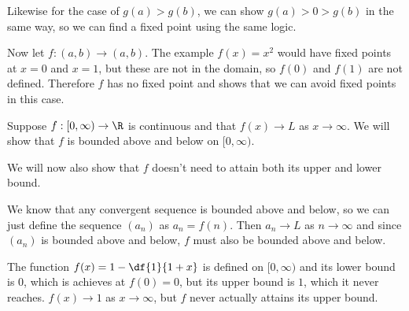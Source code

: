 \documentclass[a4paper]{article}
\begin{document}
Likewise for the case of $g(a) > g(b)$, we can show $g(a) > 0 > g(b)$ in the same way, so we can find a fixed point using the same logic.

Now let $f : (a, b) \to (a, b)$. The example $f(x) = x^2$ would have fixed points at $x=0$ and $x=1$, but these are not in the domain, so $f(0)$ and $f(1)$ are not defined. Therefore $f$ has no fixed point and shows that we can avoid fixed points in this case.


Suppose $f : [0, \infty) \to \R$ is continuous and that $f(x) \to L$ as $x \to \infty$. We will show that $f$ is bounded above and below on $[0, \infty)$.

We will now also show that $f$ doesn't need to attain both its upper and lower bound.

We know that any convergent sequence is bounded above and below, so we can just define the sequence $(a_n)$ as $a_n = f(n)$. Then $a_n \to L$ as $n \to \infty$ and since $(a_n)$ is bounded above and below, $f$ must also be bounded above and below.

The function $f(x) = 1 - \df{1}{1+x}$ is defined on $[0, \infty)$ and its lower bound is $0$, which is achieves at $f(0) = 0$, but its upper bound is $1$, which it never reaches. $f(x) \to 1$ as $x \to \infty$, but $f$ never actually attains its upper bound.
\end{document}
